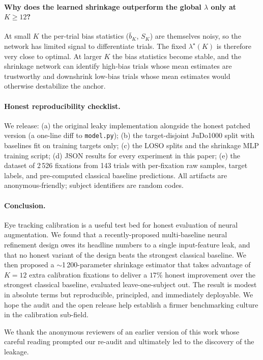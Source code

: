 \paragraph{Why does the learned shrinkage outperform the global $\lambda$
only at $K \ge 12$?}
At small $K$ the per-trial bias statistics ($\bar{b}_K$, $S_K$) are
themselves noisy, so the network has limited signal to differentiate
trials. The fixed $\lambda^\star(K)$ is therefore very close to optimal.
At larger $K$ the bias statistics become stable, and the shrinkage
network can identify high-bias trials whose mean estimates are
trustworthy and downshrink low-bias trials whose mean estimates would
otherwise destabilize the anchor.

\paragraph{Honest reproducibility checklist.}
We release: (a) the original leaky implementation alongside the honest
patched version (a one-line diff to \texttt{model.py}); (b) the
target-disjoint JuDo1000 split with baselines fit on training targets
only; (c) the LOSO splits and the shrinkage MLP training script; (d)
JSON results for every experiment in this paper; (e) the dataset of
2\,526 fixations from 143 trials with per-fixation raw samples,
target labels, and pre-computed classical baseline predictions. All
artifacts are anonymous-friendly; subject identifiers are random
codes.

\paragraph{Conclusion.}
Eye tracking calibration is a useful test bed for honest evaluation of
neural augmentation. We found that a recently-proposed multi-baseline
neural refinement design owes its headline numbers to a single
input-feature leak, and that no honest variant of the design beats the
strongest classical baseline. We then proposed a $\sim$1\,200-parameter
shrinkage estimator that takes advantage of $K=12$ extra calibration
fixations to deliver a $17\%$ honest improvement over the strongest
classical baseline, evaluated leave-one-subject out. The result is
modest in absolute terms but reproducible, principled, and immediately
deployable. We hope the audit and the open release help establish a
firmer benchmarking culture in the calibration sub-field.

\begin{ack}
We thank the anonymous reviewers of an earlier version of this work
whose careful reading prompted our re-audit and ultimately led to the
discovery of the leakage.
\end{ack}
